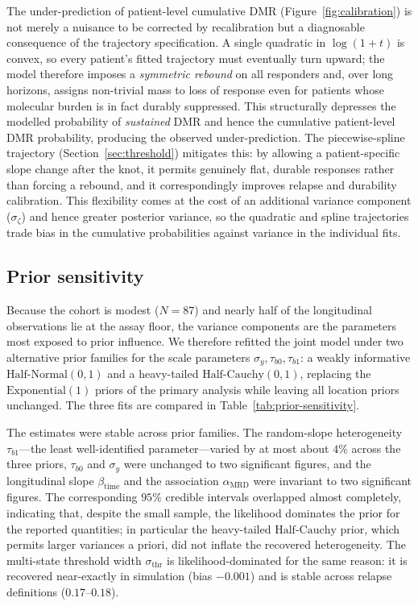 \documentclass[11pt]{article}
\begin{document}
The under-prediction of patient-level cumulative DMR
(Figure~\ref{fig:calibration}) is not merely a nuisance to be corrected by
recalibration but a diagnosable consequence of the trajectory specification. A
single quadratic in $\log(1+t)$ is convex, so every patient's fitted trajectory
must eventually turn upward; the model therefore imposes a \emph{symmetric
rebound} on all responders and, over long horizons, assigns non-trivial mass to
loss of response even for patients whose molecular burden is in fact durably
suppressed. This structurally depresses the modelled probability of
\emph{sustained} DMR and hence the cumulative patient-level DMR probability,
producing the observed under-prediction. The piecewise-spline trajectory
(Section~\ref{sec:threshold}) mitigates this: by allowing a patient-specific
slope change after the knot, it permits genuinely flat, durable responses
rather than forcing a rebound, and it correspondingly improves relapse and
durability calibration. This flexibility comes at the cost of an additional
variance component ($\sigma_\zeta$) and hence greater posterior variance, so the
quadratic and spline trajectories trade bias in the cumulative probabilities
against variance in the individual fits.

\subsection{Prior sensitivity}
\label{sec:priorsens}

Because the cohort is modest ($N=87$) and nearly half of the longitudinal
observations lie at the assay floor, the variance components are the parameters
most exposed to prior influence. We therefore refitted the joint model under
two alternative prior families for the scale parameters
$\sigma_y,\tau_{b0},\tau_{b1}$: a weakly informative $\mathrm{Half\text{-}Normal}(0,1)$
and a heavy-tailed $\mathrm{Half\text{-}Cauchy}(0,1)$, replacing the
$\mathrm{Exponential}(1)$ priors of the primary analysis while leaving all
location priors unchanged. The three fits are compared in
Table~\ref{tab:prior-sensitivity}.

The estimates were stable across prior families. The random-slope heterogeneity
$\tau_{b1}$---the least well-identified parameter---varied by at most about
$4\%$ across the three priors, $\tau_{b0}$ and $\sigma_y$ were unchanged to two
significant figures, and the longitudinal slope $\beta_{\mathrm{time}}$ and the
association $\alpha_{\mathrm{MRD}}$ were invariant to two significant figures.
The corresponding $95\%$ credible intervals overlapped almost completely,
indicating that, despite the small sample, the likelihood dominates the prior
for the reported quantities; in particular the heavy-tailed
$\mathrm{Half\text{-}Cauchy}$ prior, which permits larger variances a priori,
did not inflate the recovered heterogeneity. The multi-state threshold width
$\sigma_{\mathrm{thr}}$ is likelihood-dominated for the same reason: it is
recovered near-exactly in simulation (bias $-0.001$) and is stable across
relapse definitions ($0.17$--$0.18$).
\end{document}
